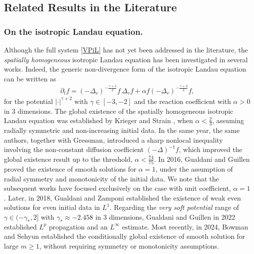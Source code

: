 \documentclass[reqno,11pt,final]{amsart}
\theoremstyle{plain}
\numberwithin{equation}{section}
\numberwithin{theorem}{section}
\begin{document}
\subsection{Related Results in the Literature} \subsubsection{On the isotropic Landau equation. }Although the full system \eqref{VPiL} has not yet been addressed in the literature, the \textit{spatially homogeneous} isotropic Landau equation has been investigated in several works. Indeed, the generic non-divergence form of the isotropic Landau equation can be written as
\begin{align*}
    \partial_t f = (-\Delta_v)^{-\frac{\gamma+5}{2}} f\, \Delta_v f + \alpha f(-\Delta_v)^{-\frac{\gamma+3}{2}}f,
\end{align*} for the potential $|\cdot|^{\gamma+2}$ with $\gamma\in [-3,-2]$ and the reaction coefficient with $\alpha>0$ in 3 dimensions.
The global existence of the spatially homogeneous isotropic Landau equation was established by Krieger and Strain \cite{iL_KS_2012}, when $\alpha<\frac{2}{3}$, assuming radially symmetric and non-increasing initial data. In the same year, the same authors, together with Gressman, introduced a sharp nonlocal inequality \cite{iL_KS_2012_2} involving the non-constant diffusion coefficient $(-\Delta)^{-1}f$, which improved the global existence result up to the threshold, $\alpha<\frac{74}{75}$. In 2016, Gualdani and Guillen \cite{iL_Gualdani_2016} proved the existence of smooth solutions for $\alpha=1$, under the assumption of radial symmetry and monotonicity of the initial data. We note that the subsequent works have focused exclusively on the case with unit coefficient, $\alpha=1$. Later, in 2018, Gualdani and Zamponi \cite{iL_Gualdani_2018} established the existence of weak even solutions for even initial data in $L^1$. Regarding the \textit{very soft potential} range of $\gamma\in(-\gamma_*,2] $ with $\gamma_*\approx -2.458$ in 3 dimensions, Gualdani and Guillen in 2022 established $L^p$ propagation and an $L^\infty $ estimate.    Most recently, in 2024, Bowman and Sehyun \cite{iL_Bowman_2024} established the conditionally global existence of smooth solution for large $m\ge1$, without requiring symmetry or monotonicity assumptions.
\end{document}
